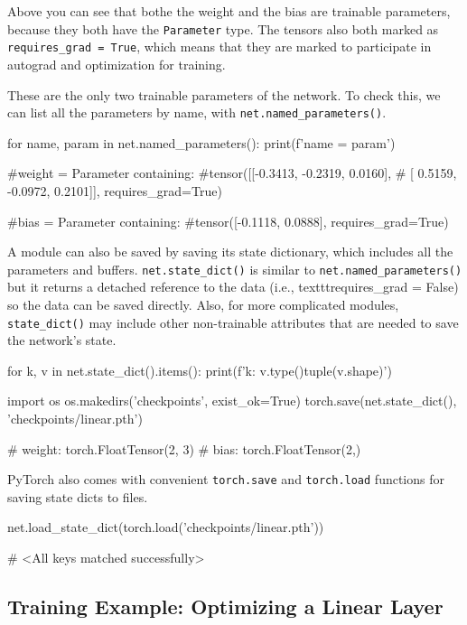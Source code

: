 Above you can see that bothe the weight and the bias are trainable parameters, because they both have the \texttt{Parameter} type. The tensors also both marked as \texttt{requires\_grad = True}, which means that they are marked to participate in autograd and optimization for training. 

These are the only two trainable parameters of the network. To check this, we can list all the parameters by name, with \texttt{net.named\_parameters()}.

\begin{codeblock}[language=python]
for name, param in net.named_parameters():
print(f'{name} = {param}\n')

#weight = Parameter containing:
#tensor([[-0.3413, -0.2319,  0.0160],
#        [ 0.5159, -0.0972,  0.2101]], requires_grad=True)

#bias = Parameter containing:
#tensor([-0.1118,  0.0888], requires_grad=True)
\end{codeblock}

A module can also be saved by saving its state dictionary, which includes all the parameters and buffers. \texttt{net.state\_dict()} is similar to \texttt{net.named\_parameters()} but it returns a detached reference to the data (i.e.,  texttt{requires\_grad = False}) so the data can be saved directly. Also, for more complicated modules, \texttt{state\_dict()} may include other non-trainable attributes that are needed to save the network's state. 

\begin{codeblock}[language=python]
for k, v in net.state_dict().items():
    print(f'{k}: {v.type()}{tuple(v.shape)}')

import os
os.makedirs('checkpoints', exist_ok=True)
torch.save(net.state_dict(), 'checkpoints/linear.pth')

# weight: torch.FloatTensor(2, 3)
# bias: torch.FloatTensor(2,)
\end{codeblock}

PyTorch also comes with convenient \texttt{torch.save} and \texttt{torch.load} functions for saving state dicts to files. 

\begin{codeblock}[language=python]
net.load_state_dict(torch.load('checkpoints/linear.pth'))

# <All keys matched successfully>
\end{codeblock}

\subsection{Training Example: Optimizing a Linear Layer}












